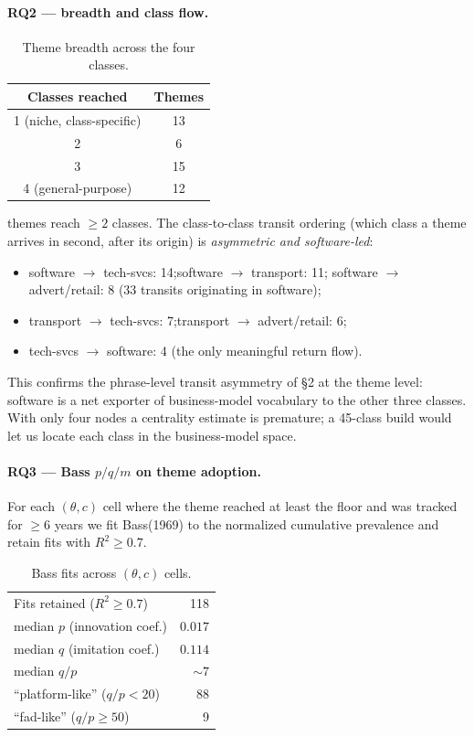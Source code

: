 \documentclass[11pt]{article}
\begin{document}
\paragraph{RQ2 --- breadth and class flow.}
\begin{table}[h]\centering\small
\caption{Theme breadth across the four classes.}
\begin{tabular}{cc}
\toprule
Classes reached & Themes \\
\midrule
1 (niche, class-specific) & 13 \\
2 & 6 \\
3 & 15 \\
4 (general-purpose)       & 12 \\
\bottomrule
\end{tabular}
\end{table}

 themes reach $\geq 2$ classes. The class-to-class transit
ordering (which class a theme arrives in second, after its origin) is
\emph{asymmetric and software-led}:
\begin{itemize}[nosep]
\item software $\to$ tech-svcs: 14;\quad software $\to$ transport: 11;\quad
software $\to$ advert/retail: 8 (33 transits originating in software);
\item transport $\to$ tech-svcs: 7;\quad transport $\to$ advert/retail: 6;
\item tech-svcs $\to$ software: 4 (the only meaningful return flow).
\end{itemize}
\noindent This confirms the phrase-level transit asymmetry of §2 at the
theme level: software is a net exporter of business-model vocabulary to the
other three classes. With only four nodes a centrality estimate is premature;
a 45-class build would let us locate each class in the business-model space.

\paragraph{RQ3 --- Bass $p/q/m$ on theme adoption.} For each $(\theta, c)$ cell
where the theme reached at least the floor and was tracked for $\geq 6$ years
we fit Bass(1969) to the normalized cumulative prevalence and retain fits with
$R^2 \geq 0.7$.

\begin{table}[h]\centering\small
\caption{Bass fits across $(\theta, c)$ cells.}
\begin{tabular}{lr}
\toprule
Fits retained ($R^2 \geq 0.7$) & 118 \\
median $p$ (innovation coef.) & $0.017$ \\
median $q$ (imitation coef.)  & $0.114$ \\
median $q/p$                   & $\sim 7$ \\
``platform-like'' ($q/p<20$)   & 88 \\
``fad-like'' ($q/p\geq 50$)    & 9 \\
\bottomrule
\end{tabular}
\end{table}
\end{document}
